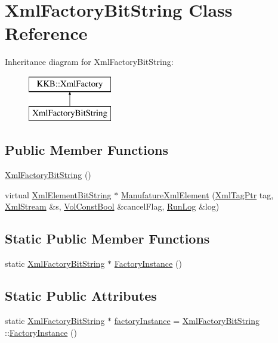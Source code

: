 \hypertarget{class_xml_factory_bit_string}{}\section{Xml\+Factory\+Bit\+String Class Reference}
\label{class_xml_factory_bit_string}
Inheritance diagram for Xml\+Factory\+Bit\+String\+:\begin{figure}[H]
\begin{center}
\leavevmode
\includegraphics[height=2.000000cm]{class_xml_factory_bit_string}
\end{center}
\end{figure}
\subsection*{Public Member Functions}
\begin{DoxyCompactItemize}
\item 
\hyperlink{class_xml_factory_bit_string_ae0d307870b23ffab31d1648eb2a0c7a4}{Xml\+Factory\+Bit\+String} ()
\item 
virtual \hyperlink{namespace_k_k_b_a08eccbf7626d1c9bc414dce125921ce1}{Xml\+Element\+Bit\+String} $\ast$ \hyperlink{class_xml_factory_bit_string_a6dd14ea4fbd797ab9b5c336518ab54cc}{Manufature\+Xml\+Element} (\hyperlink{namespace_k_k_b_a9253a3ea8a5da18ca82be4ca2b390ef0}{Xml\+Tag\+Ptr} tag, \hyperlink{class_k_k_b_1_1_xml_stream}{Xml\+Stream} \&s, \hyperlink{namespace_k_k_b_a7d390f568e2831fb76b86b56c87bf92f}{Vol\+Const\+Bool} \&cancel\+Flag, \hyperlink{class_k_k_b_1_1_run_log}{Run\+Log} \&log)
\end{DoxyCompactItemize}
\subsection*{Static Public Member Functions}
\begin{DoxyCompactItemize}
\item 
static \hyperlink{class_xml_factory_bit_string}{Xml\+Factory\+Bit\+String} $\ast$ \hyperlink{class_xml_factory_bit_string_a65eadbc9079d813d54b99bbb93138092}{Factory\+Instance} ()
\end{DoxyCompactItemize}
\subsection*{Static Public Attributes}
\begin{DoxyCompactItemize}
\item 
static \hyperlink{class_xml_factory_bit_string}{Xml\+Factory\+Bit\+String} $\ast$ \hyperlink{class_xml_factory_bit_string_a8ba66a48519acd77b695e0b6a71eb0aa}{factory\+Instance} = \hyperlink{class_xml_factory_bit_string}{Xml\+Factory\+Bit\+String} \+::\hyperlink{class_xml_factory_bit_string_a65eadbc9079d813d54b99bbb93138092}{Factory\+Instance} ()
\end{DoxyCompactItemize}


